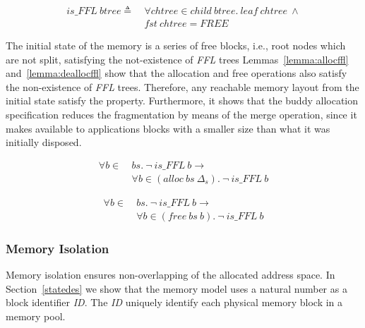\begin{definition} 
\label{def:FF4}
\end{definition}
\vspace{-7pt}
\begin{align*}
is\_FFL\ btree \triangleq\ &\forall chtree \in child\ btree.\ leaf\ chtree\ \wedge \\
&fst\ chtree = FREE
\end{align*}
\vspace{-12pt}

The initial state of the memory is a series of free blocks, i.e., root nodes which are not split, satisfying the not-existence of \emph{FFL} trees Lemmas~\ref{lemma:allocffl} and~\ref{lemma:deallocffl} show that the allocation and free operations also satisfy the non-existence of \emph{FFL} trees. Therefore, any reachable memory layout from the initial state satisfy the property. Furthermore, it shows that the buddy allocation specification reduces the fragmentation by means of the merge operation, since it makes available to applications blocks with a smaller size than what it was initially disposed.

\begin{lemma} 
\label{lemma:allocffl}
\begin{align*}
\forall b \in\ &bs.\ \neg\ is\_FFL\ b \longrightarrow \\
&\forall b \in (alloc\ bs\ \Delta_s).\ \neg\ is\_FFL\ b
\end{align*}
\end{lemma}

\begin{lemma} 
\label{lemma:deallocffl}
\begin{align*}
\forall b \in\ &bs.\ \neg\ is\_FFL\ b \longrightarrow \\
&\forall b \in (free\ bs\ b).\ \neg\ is\_FFL\ b
\end{align*}
\end{lemma}

\subsubsection{Memory Isolation}
Memory isolation ensures non-overlapping of the allocated address space. In Section~\ref{statedes} we show that the memory model uses a natural number as a block identifier \emph{ID}. The \emph{ID} uniquely identify each physical memory block in a memory pool.

